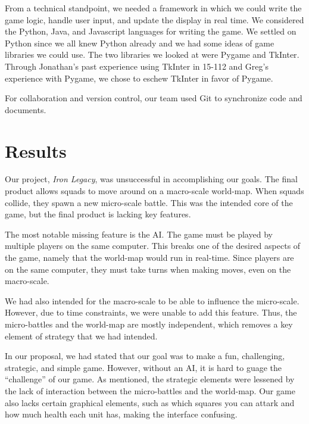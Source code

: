 \documentclass{article}
\begin{document}
From a technical standpoint, we needed a framework in which we could write the
game logic, handle user input, and update the display in real time.
We considered the Python\cite{Python}, Java\cite{Java}, and 
Javascript\cite{Javascript} languages for writing the game. 
We settled on Python since we all knew Python already and we had some ideas of
game libraries we could use.
The two libraries we looked at were Pygame\cite{Pygame} and 
TkInter\cite{TkInter}.
Through Jonathan's past experience using TkInter in 15-112 and Greg's 
experience with Pygame, we chose to eschew TkInter in favor of Pygame.

For collaboration and version control, our team used Git \cite{Git} to
synchronize code and documents.

\section*{Results}

Our project, \emph{Iron Legacy}, was unsuccessful in accomplishing
    our goals.
    The final product allows squads to move around on a macro-scale world-map.
    When squads collide, they spawn a new micro-scale battle.
    This was the intended core of the game, but the final product is lacking
    key features.

The most notable missing feature is the AI.
    The game must be played by multiple players on the same computer.
    This breaks one of the desired aspects of the game,
    namely that the world-map would run in real-time.
    Since players are on the same computer, they must take turns when making
    moves, even on the macro-scale.

We had also intended for the macro-scale to be able to influence the
    micro-scale.
    However, due to time constraints, we were unable to add this feature.
    Thus, the micro-battles and the world-map are mostly independent,
    which removes a key element of strategy that we had intended.

In our proposal, we had stated that our goal was to make a fun, challenging,
    strategic, and simple game.
    However, without an AI, it is hard to guage the ``challenge'' of our game.
    As mentioned, the strategic elements were lessened by the lack of
    interaction between the micro-battles and the world-map.
    Our game also lacks certain graphical elements, such as which squares
    you can attark and how much health each unit has, making the interface
    confusing.
\end{document}
